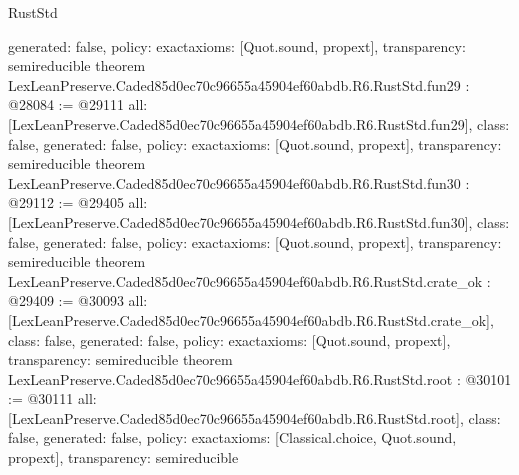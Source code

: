 \begin{lexlean}{RustStd}
\begin{coremodule}
{  generated: false,
  policy: exact{axioms: [Quot.sound, propext]},
  transparency: semireducible
}
theorem LexLeanPreserve.Caded85d0ec70c96655a45904ef60abdb.R6.RustStd.fun29 : @28084 := @29111 {
  all: [LexLeanPreserve.Caded85d0ec70c96655a45904ef60abdb.R6.RustStd.fun29],
  class: false,
  generated: false,
  policy: exact{axioms: [Quot.sound, propext]},
  transparency: semireducible
}
theorem LexLeanPreserve.Caded85d0ec70c96655a45904ef60abdb.R6.RustStd.fun30 : @29112 := @29405 {
  all: [LexLeanPreserve.Caded85d0ec70c96655a45904ef60abdb.R6.RustStd.fun30],
  class: false,
  generated: false,
  policy: exact{axioms: [Quot.sound, propext]},
  transparency: semireducible
}
theorem LexLeanPreserve.Caded85d0ec70c96655a45904ef60abdb.R6.RustStd.crate_ok : @29409 := @30093 {
  all: [LexLeanPreserve.Caded85d0ec70c96655a45904ef60abdb.R6.RustStd.crate_ok],
  class: false,
  generated: false,
  policy: exact{axioms: [Quot.sound, propext]},
  transparency: semireducible
}
theorem LexLeanPreserve.Caded85d0ec70c96655a45904ef60abdb.R6.RustStd.root : @30101 := @30111 {
  all: [LexLeanPreserve.Caded85d0ec70c96655a45904ef60abdb.R6.RustStd.root],
  class: false,
  generated: false,
  policy: exact{axioms: [Classical.choice, Quot.sound, propext]},
  transparency: semireducible
}


\end{coremodule}
\end{lexlean}
